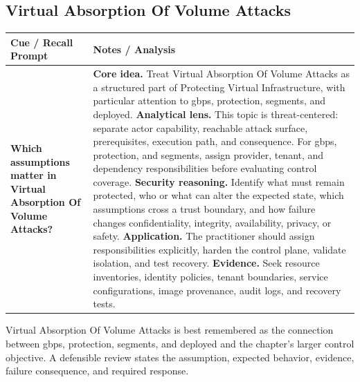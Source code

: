 \documentclass[11pt]{article}
\newcommand{\CornellHeader}{%
\rowcolor{Navy}\color{white}\bfseries Cue / Recall Prompt & \color{white}\bfseries Notes / Analysis\\\hline}
\newcommand{\CornellRow}[2]{%
\cellcolor{CueGray}\RaggedRight\textbf{#1} & \RaggedRight #2\\\hline}
\begin{document}
\subsection*{Virtual Absorption Of Volume Attacks}
\begin{longtable}{>{\RaggedRight\arraybackslash}p{}|>{\RaggedRight\arraybackslash}p{}}
\CornellHeader
\CornellRow{Which assumptions matter in Virtual Absorption Of Volume Attacks?}{\textbf{Core idea.} Treat Virtual Absorption Of Volume Attacks as a structured part of Protecting Virtual Infrastructure, with particular attention to gbps, protection, segments, and deployed. \textbf{Analytical lens.} This topic is threat-centered: separate actor capability, reachable attack surface, prerequisites, execution path, and consequence. For gbps, protection, and segments, assign provider, tenant, and dependency responsibilities before evaluating control coverage. \textbf{Security reasoning.} Identify what must remain protected, who or what can alter the expected state, which assumptions cross a trust boundary, and how failure changes confidentiality, integrity, availability, privacy, or safety. \textbf{Application.} The practitioner should assign responsibilities explicitly, harden the control plane, validate isolation, and test recovery. \textbf{Evidence.} Seek resource inventories, identity policies, tenant boundaries, service configurations, image provenance, audit logs, and recovery tests.}
\end{longtable}
\begin{topicsummary}
Virtual Absorption Of Volume Attacks is best remembered as the connection between gbps, protection, segments, and deployed and the chapter's larger control objective. A defensible review states the assumption, expected behavior, evidence, failure consequence, and required response.
\end{topicsummary}
\end{document}
